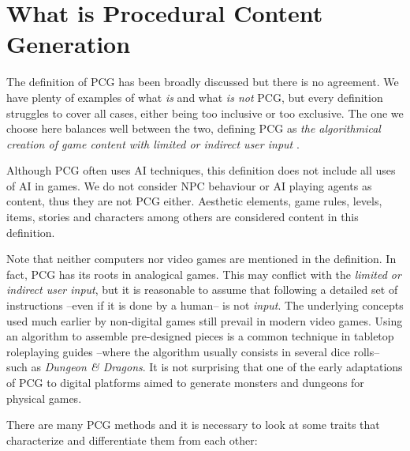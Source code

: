 \section{What is Procedural Content Generation}
The definition of \acf{PCG} has been broadly discussed but there is no agreement. We have plenty of examples of what \textit{is} and what \textit{is not} \ac{PCG}, but every definition struggles to cover all cases, either being too inclusive or too exclusive. The one we choose here balances well between the two, defining \ac{PCG} as \textit{the algorithmical creation of game content with limited or indirect user input} \cite{togelius2011procedural}.

Although \ac{PCG} often uses AI techniques, this definition does not include all uses of AI in games. We do not consider \acs{NPC} behaviour or AI playing agents as content, thus they are not \ac{PCG} either. Aesthetic elements, game rules, levels, items, stories and characters among others are considered content in this definition.

Note that neither computers nor video games are mentioned in the definition. In fact, \ac{PCG} has its roots in analogical games. This may conflict with the \textit{limited or indirect user input}, but it is reasonable to assume that following a detailed set of instructions --even if it is done by a human-- is not \textit{input}. The underlying concepts used much earlier by non-digital games still prevail in modern video games. Using an algorithm to assemble pre-designed pieces is a common technique in tabletop roleplaying guides --where the algorithm usually consists in several dice rolls-- such as \textit{Dungeon \& Dragons}. It is not surprising that one of the early adaptations of \ac{PCG} to digital platforms aimed to generate monsters and dungeons for physical games.\cite{smith2015analog}

There are many \ac{PCG} methods and it is necessary to look at some traits that characterize and differentiate them from each other: \cite{togelius2016introduction}

